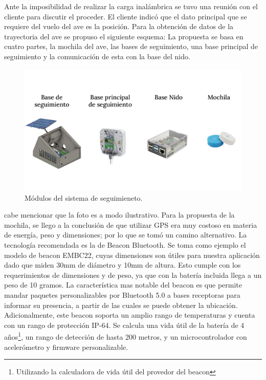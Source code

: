 Ante la imposibilidad de realizar la carga inalámbrica se tuvo una reunión con el cliente para discutir el proceder. El cliente indicó que el dato principal que se requiere del vuelo del ave es la posición.
Para la obtención de datos de la trayectoria del ave se propuso el siguiente esquema:
La propuesta se basa en cuatro partes, la mochila del ave,
 las bases de seguimiento, una base principal de seguimiento y la comunicación de esta con la base del nido.
\begin{figure}[H]
	\centering
	\includegraphics[width=\linewidth,page=1]{ImagenesFactibilidad/beacon}
	\caption{Módulos del sistema de seguimieneto.}
	\label{fig:componentes beacon}
\end{figure}
cabe mencionar que la foto es a modo ilustrativo.
Para la propuesta de la mochila, se llego a la conclusión de que utilizar GPS era muy costoso en materia de energía, peso y dimensiones; por lo que se tomó un camino alternativo.
La tecnología recomendada es la de Beacon Bluetooth. Se toma como ejemplo el modelo de beacon EMBC22, cuyas dimensiones son útiles para nuestra aplicación dado que miden 30mm de diámetro y 10mm de altura. Esto cumple con los requerimientos de dimensiones y de peso, ya que con la batería incluida llega a un peso de 10 gramos. La característica mas notable del beacon es que permite mandar paquetes personalizables por Bluetooth 5.0 a bases receptoras para informar su presencia, a partir de las cuales se puede obtener la ubicación.
Adicionalmente, este beacon soporta un amplio rango de temperaturas y cuenta con un rango de protección IP-64. Se calcula una vida útil de la batería de 4 años\footnote{Utilizando la calculadora de vida útil del provedor del beacon}, un rango de detección de hasta 200 metros, y un microcontrolador con acelerómetro y firmware personalizable.
